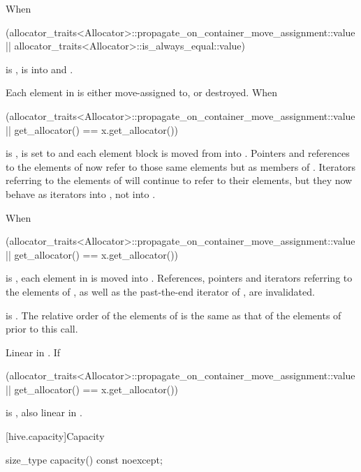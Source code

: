 \begin{itemdescr}
\pnum
\expects
When
\begin{codeblock}
(allocator_traits<Allocator>::propagate_on_container_move_assignment::value ||
 allocator_traits<Allocator>::is_always_equal::value)
\end{codeblock}
is ,
 is  into  and
.

\pnum
\effects
Each element in  is either move-assigned to, or destroyed.
When
\begin{codeblock}
(allocator_traits<Allocator>::propagate_on_container_move_assignment::value ||
 get_allocator() == x.get_allocator())
\end{codeblock}
is ,
 is set to  and
each element block is moved from  into .
Pointers and references to the elements of 
now refer to those same elements but as members of .
Iterators referring to the elements of 
will continue to refer to their elements,
but they now behave as iterators into , not into .

When
\begin{codeblock}
(allocator_traits<Allocator>::propagate_on_container_move_assignment::value ||
 get_allocator() == x.get_allocator())
\end{codeblock}
is ,
each element in  is moved into .
References, pointers and iterators referring to the elements of ,
as well as the past-the-end iterator of , are invalidated.

\pnum
\ensures
{} is .
The relative order of the elements of 
is the same as that of the elements of  prior to this call.

\pnum
\complexity
Linear in .
If
\begin{codeblock}
(allocator_traits<Allocator>::propagate_on_container_move_assignment::value ||
 get_allocator() == x.get_allocator())
\end{codeblock}
is , also linear in .
\end{itemdescr}

[hive.capacity]{Capacity}

%
\begin{itemdecl}
size_type capacity() const noexcept;
\end{itemdecl}

